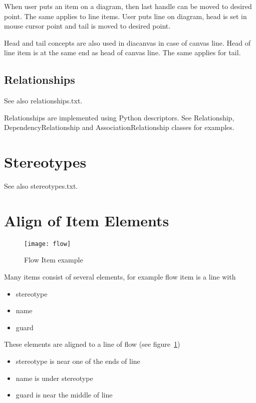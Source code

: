 \documentclass[draft]{article}
\begin{document}
When user puts an item on a diagram, then last handle can be moved to
desired point. The same applies to line items. User puts line on diagram,
head is set in mouse cursor point and tail is moved to desired point.

Head and tail concepts are also used in diacanvas in case of canvas line.
Head of line item is at the same end as head of canvas line. The same
applies for tail.

\subsection{Relationships}
See also relationships.txt.

Relationships are implemented using Python descriptors. See Relationship,
DependencyRelationship and AssociationRelationship classes for examples.

\section{Stereotypes}
See also stereotypes.txt.

\section{Align of Item Elements}

\begin{figure}
\begin{center}
\texttt{[image: flow]}
\end{center}
\caption{Flow Item example}\label{items:example:flow}
\end{figure}

Many items consist of several elements, for example flow item is a line
with
\begin{itemize}
\item stereotype
\item name
\item guard
\end{itemize}
These elements are aligned to a line of flow (see
figure~\ref{items:example:flow})
\begin{itemize}
\item stereotype is near one of the ends of line
\item name is under stereotype
\item guard is near the middle of line
\end{itemize}
\end{document}
